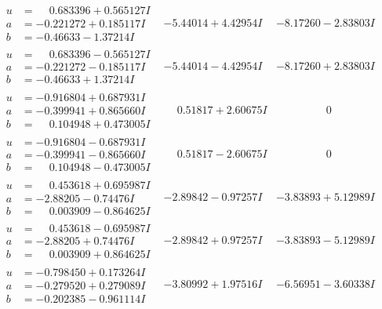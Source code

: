 \documentclass[1p]{elsarticle_modified}
\theoremstyle{definition}
\begin{document}
$$\begin{array}{c|c|c}
\begin{aligned}
u &= \phantom{-}0.683396 + 0.565127 I \\
a &= -0.221272 + 0.185117 I \\
b &= -0.46633 - 1.37214 I\end{aligned}
 & -5.44014 + 4.42954 I & -8.17260 - 2.83803 I \\ \hline\begin{aligned}
u &= \phantom{-}0.683396 - 0.565127 I \\
a &= -0.221272 - 0.185117 I \\
b &= -0.46633 + 1.37214 I\end{aligned}
 & -5.44014 - 4.42954 I & -8.17260 + 2.83803 I \\ \hline\begin{aligned}
u &= -0.916804 + 0.687931 I \\
a &= -0.399941 + 0.865660 I \\
b &= \phantom{-}0.104948 + 0.473005 I\end{aligned}
 & \phantom{-}0.51817 + 2.60675 I & \phantom{-0.000000 } 0 \\ \hline\begin{aligned}
u &= -0.916804 - 0.687931 I \\
a &= -0.399941 - 0.865660 I \\
b &= \phantom{-}0.104948 - 0.473005 I\end{aligned}
 & \phantom{-}0.51817 - 2.60675 I & \phantom{-0.000000 } 0 \\ \hline\begin{aligned}
u &= \phantom{-}0.453618 + 0.695987 I \\
a &= -2.88205 - 0.74476 I \\
b &= \phantom{-}0.003909 - 0.864625 I\end{aligned}
 & -2.89842 - 0.97257 I & -3.83893 + 5.12989 I \\ \hline\begin{aligned}
u &= \phantom{-}0.453618 - 0.695987 I \\
a &= -2.88205 + 0.74476 I \\
b &= \phantom{-}0.003909 + 0.864625 I\end{aligned}
 & -2.89842 + 0.97257 I & -3.83893 - 5.12989 I \\ \hline\begin{aligned}
u &= -0.798450 + 0.173264 I \\
a &= -0.279520 + 0.279089 I \\
b &= -0.202385 - 0.961114 I\end{aligned}
 & -3.80992 + 1.97516 I & -6.56951 - 3.60338 I \\ \hline\begin{aligned}

\end{aligned}
\end{array}$$
\end{document}
